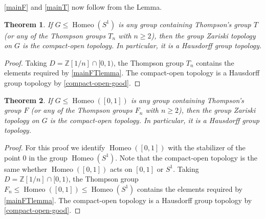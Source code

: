 \documentclass[11pt]{amsart}
\makeatletter
\newtheorem{theorem}{Theorem}[section]
\newtheorem{conjecture}[theorem]{Conjecture}
\newcommand{\Z}{\mathbb Z}
\newcommand{\Homeo}{\operatorname{Homeo}}
\newcommand{\makeset}[2]{\left\lbrace #1 \;\middle|\;
 \begin{tabular}{@{}l@{}}
   #2
  \end{tabular}
  \right\rbrace}
\makeatother
\begin{document}
\cref{mainF} and \cref{mainT} now follow from the Lemma.

\begin{theorem}
    If \(G\leq \Homeo(S^1)\) is any group containing Thompson's group \(T\) (or any of the Thompson groups \(T_n\) with \(n\geq 2\)), then the group Zariski topology on \(G\) is the compact-open topology. In particular, it is a Hausdorff group topology.
\end{theorem}
\begin{proof}
    Taking \(D=\Z[1/n] \cap [0,1)\), the Thompson group \(T_n\) contains the elements required by \cref{mainFTlemma}.
    The compact-open topology is a Hausdorff group topology by \cref{compact-open-good}.
\end{proof}

\begin{theorem}
    If \(G\leq \Homeo([0,1])\) is any group containing Thompson's group \(F\) (or any of the Thompson groups \(F_n\) with \(n\geq 2\)), then the group Zariski topology on \(G\) is the compact-open topology. In particular, it is a Hausdorff group topology.
\end{theorem}
\begin{proof}
    For this proof we identify \(\Homeo([0,1])\) with the stabilizer of the point \(0\) in the group \(\Homeo(S^1)\).
    Note that the compact-open topology is the same whether \(\Homeo([0,1])\) acts on \([0,1]\) or \(S^1\).
    Taking \(D=\Z[1/n] \cap [0,1)\), the Thompson group \(F_n\leq \Homeo([0,1])\leq \operatorname{Homeo}(S^1)\) contains the elements required by \cref{mainFTlemma}.
    The compact-open topology is a Hausdorff group topology by \cref{compact-open-good}.
\end{proof}



\end{document}
